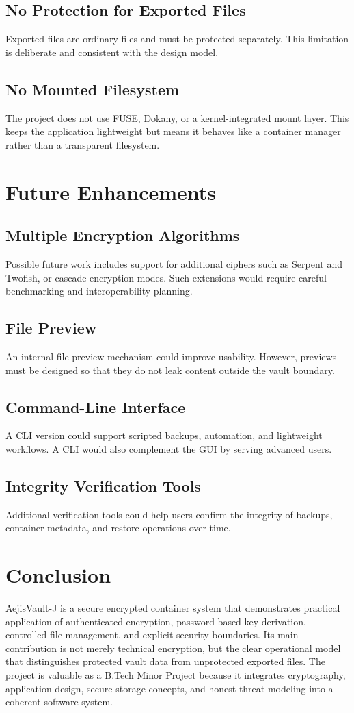 \documentclass[12pt,a4paper]{report}
\newcommand{\projname}{AejisVault-J}
\begin{document}
\section{No Protection for Exported Files}
Exported files are ordinary files and must be protected separately. This limitation is deliberate and consistent with the design model.

\section{No Mounted Filesystem}
The project does not use FUSE, Dokany, or a kernel-integrated mount layer. This keeps the application lightweight but means it behaves like a container manager rather than a transparent filesystem.

\chapter{Future Enhancements}
\section{Multiple Encryption Algorithms}
Possible future work includes support for additional ciphers such as Serpent and Twofish, or cascade encryption modes. Such extensions would require careful benchmarking and interoperability planning.

\section{File Preview}
An internal file preview mechanism could improve usability. However, previews must be designed so that they do not leak content outside the vault boundary.

\section{Command-Line Interface}
A CLI version could support scripted backups, automation, and lightweight workflows. A CLI would also complement the GUI by serving advanced users.

\section{Integrity Verification Tools}
Additional verification tools could help users confirm the integrity of backups, container metadata, and restore operations over time.

\chapter{Conclusion}
\projname{} is a secure encrypted container system that demonstrates practical application of authenticated encryption, password-based key derivation, controlled file management, and explicit security boundaries. Its main contribution is not merely technical encryption, but the clear operational model that distinguishes protected vault data from unprotected exported files. The project is valuable as a B.Tech Minor Project because it integrates cryptography, application design, secure storage concepts, and honest threat modeling into a coherent software system.
\end{document}
